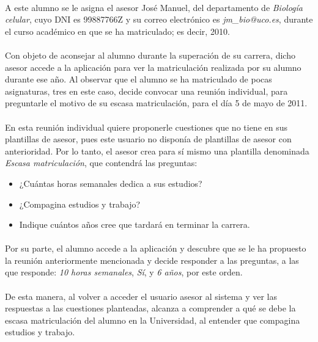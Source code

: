  \paragraph{}A este alumno se le asigna el asesor José Manuel, del departamento
  de \textit{Biología celular}, cuyo DNI es 99887766Z y su correo electrónico
  es \textit{jm\_bio@uco.es}, durante el curso académico en que se ha
  matriculado; es decir, 2010.

  \paragraph{}Con objeto de aconsejar al alumno durante la superación de su
  carrera, dicho asesor accede a la aplicación para ver la matriculación
  realizada por su alumno durante ese año. Al observar que el alumno se ha
  matriculado de pocas asignaturas, tres en este caso, decide convocar una
  reunión individual, para preguntarle el motivo de su escasa matriculación,
  para el día 5 de mayo de 2011.

  \paragraph{}En esta reunión individual quiere proponerle cuestiones que no
  tiene en sus plantillas de asesor, pues este usuario no disponía de plantillas
  de asesor con anterioridad. Por lo tanto, el asesor crea para sí mismo una
  plantilla denominada \textit{Escasa matriculación}, que contendrá las
  preguntas:

  \begin{itemize}
   \item ¿Cuántas horas semanales dedica a sus estudios?
   \item ¿Compagina estudios y trabajo?
   \item Indique cuántos años cree que tardará en terminar la carrera.
  \end{itemize}

  \paragraph{}Por su parte, el alumno accede a la aplicación y descubre que se
  le ha propuesto la reunión anteriormente mencionada y decide responder a las
  preguntas, a las que responde: \textit{10 horas semanales},
  \textit{Sí}, y \textit{6 años}, por este orden.

  \paragraph{}De esta manera, al volver a acceder el usuario asesor al sistema
  y ver las respuestas a las cuestiones planteadas, alcanza a comprender a qué
  se debe la escasa matriculación del alumno en la Universidad, al entender que
  compagina estudios y trabajo.

